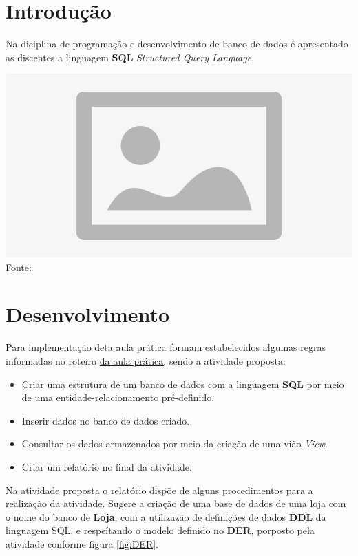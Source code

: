 
\section{Introdução}




\noindent \begin{minipage}[c]{0.6\textwidth}
  \vspace {1cm}
\par Na diciplina de programação e desenvolvimento de banco de dados é apresentado as discentes a linguagem \textbf{SQL} \textit{Structured Query Language},

\end{minipage}
\begin{minipage}[c]{0.4\textwidth}
  \includegraphics[width=\textwidth]{figure/placeholder.jpg}
  	\label{fig:place}
    {\fontsize{10pt}{\baselineskip}\selectfont
    Fonte: 
  }

\end{minipage}


\section{Desenvolvimento}
\par Para implementação deta aula prática formam estabelecidos algumas regras informadas no roteiro \href{https://github.com/OgliariNatan/database_and_data_development/blob/main/aula%20pr%C3%A1tica.pdf}{da aula prática,} sendo a atividade proposta:
\begin{itemize}
  \item Criar uma estrutura de um banco de dados com a linguagem \textbf{SQL} por meio de uma entidade-relacionamento pré-definido.
  \item Inserir dados no banco de dados criado.
  \item Consultar os dados armazenados por meio da criação de uma vião \textit{View}.
  \item Criar um relatório no final da atividade.
\end{itemize}
\par Na atividade proposta o relatório dispõe de alguns procedimentos para a realização da atividade. Sugere a criação de uma base de dados de uma loja com o nome do banco de \textbf{Loja}, com a utilizazão de definições de dados \textbf{DDL} da linguagem SQL, e respeítando o modelo definido no \textbf{DER}, porposto pela atividade conforme figura \ref{fig:DER}.

